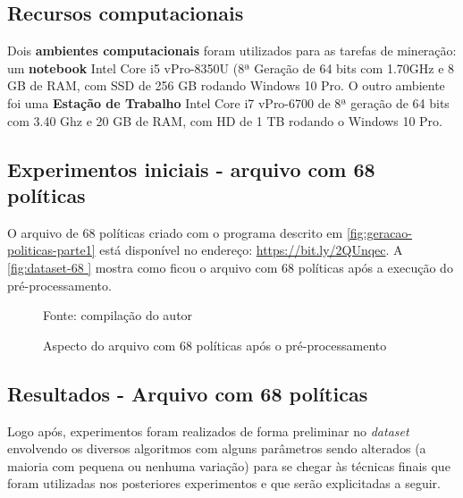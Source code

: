 \subsection{Recursos computacionais}
Dois \textbf{ambientes computacionais} foram utilizados para as tarefas de mineração: um \textbf{notebook}  Intel Core i5 vPro-8350U (8ª Geração de 64 bits com 1.70GHz e 8 GB de RAM, com SSD de 256 GB rodando Windows 10 Pro. O outro ambiente foi uma \textbf{Estação de Trabalho} Intel Core i7 vPro-6700 de 8ª geração de 64 bits com 3.40 Ghz e 20 GB de RAM, com HD de 1 TB rodando o Windows 10 Pro.

\subsection{Experimentos iniciais - arquivo com 68 políticas}\label{exp:iniciais}
O arquivo de 68 políticas criado com o programa descrito em \ref{fig:geracao-politicas-parte1} está disponível no endereço: \hyperlink{https://bit.ly/2QUnqec}{https://bit.ly/2QUnqec}.
A \autoref{fig:dataset-68 } mostra como ficou o arquivo com 68 políticas após a execução do pré-processamento.
\begin{figure}%
	\centering
	\caption{Aspecto do arquivo com 68 políticas após o pré-processamento}%
	
	\label{fig:dataset-68 }
	{\scriptsize Fonte: compilação do autor}
\end{figure}

\subsection{Resultados - Arquivo com 68 políticas}
Logo após, experimentos foram realizados de forma preliminar no \textit{dataset} envolvendo os diversos algoritmos com alguns parâmetros sendo alterados (a maioria com pequena ou nenhuma variação) para se chegar às técnicas finais que foram utilizadas nos posteriores experimentos e que serão explicitadas a seguir.

